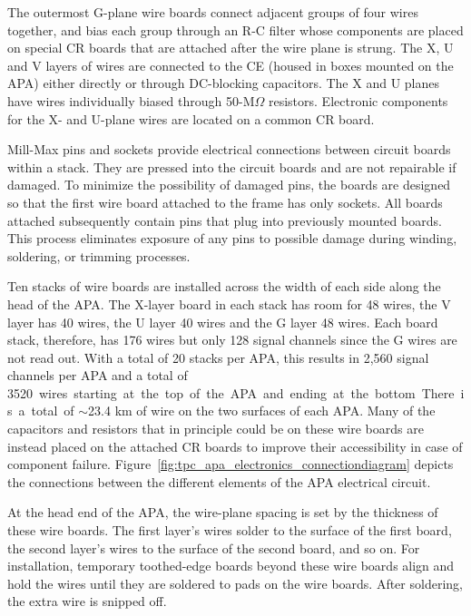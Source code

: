 
The outermost G-plane wire boards connect adjacent groups of four wires together, and bias each group through an R-C filter whose components are placed on special CR boards  %
that are attached after the wire plane is strung. The X, U and V layers of wires are connected to the CE (housed in boxes mounted on the APA) either directly or through DC-blocking capacitors. The X and U planes have wires individually biased through 50-M$\Omega$ resistors. Electronic components for the X- and U-plane wires are located on a common CR board. 

Mill-Max pins and sockets provide electrical connections between circuit boards within a stack. They are pressed into the circuit boards and are not repairable if damaged. To minimize the possibility of damaged pins, the boards are designed so that the first wire board attached to the frame has only sockets. All boards attached subsequently contain pins that plug into previously mounted boards. This process eliminates exposure of any pins to possible damage during winding, soldering, or trimming processes.

Ten stacks of wire boards are installed across the width of each side along the head of the APA.  The X-layer board in each stack has room for 48 wires, the V layer has 40 wires, the U layer 40 wires and the G layer 48 wires.  Each board stack, therefore, has 176 wires but only 128 signal channels since the G wires are not read out.  
With a total of 20 stacks per APA, this results in 2,560 signal channels per APA and a total of \SI{3520} wires starting at the top of the APA and ending at the bottom.  There is a total of $\sim$23.4 km of wire on the two surfaces of each APA.  Many of the capacitors and resistors that in principle could be on these wire boards are instead
placed on the attached CR boards to improve their accessibility in case of component failure.   Figure~\ref{fig:tpc_apa_electronics_connectiondiagram} depicts the connections between the different elements of the APA electrical circuit. %

At the head end of the APA, the wire-plane spacing is set by the thickness of these wire boards.  The first layer's wires solder to the surface of the first board, the second layer's wires to the surface of the second board, and so on.  For installation, temporary toothed-edge boards beyond these wire boards align and hold the wires until they are soldered to pads on the wire boards.  After soldering, the extra wire is snipped off. 

